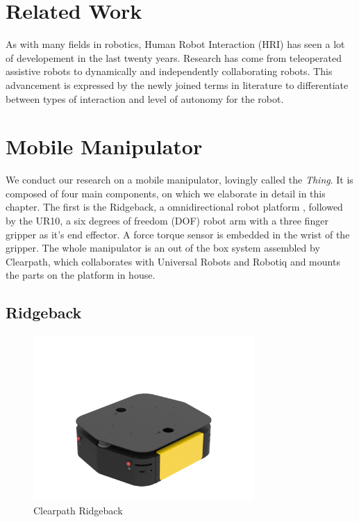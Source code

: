 \chapter{Related Work}
As with many fields in robotics, Human Robot Interaction (HRI) has seen a lot of developement in the last twenty years. Research has come from teleoperated assistive robots to dynamically and independently collaborating robots. This advancement is expressed by the newly joined terms in literature to differentiate between types of interaction and level of autonomy for the robot.

\chapter{Mobile Manipulator}
We conduct our research on a mobile manipulator, lovingly called the \emph{Thing}. It is composed of four main components, on which we elaborate in detail in this chapter. The first is the Ridgeback, a omnidirectional robot platform , followed by the UR10, a six degrees of freedom (DOF) robot arm with a three finger gripper as it's end effector. A force torque sensor is embedded in the wrist of the gripper. The whole manipulator is an out of the box system assembled by Clearpath, which collaborates with Universal Robots and Robotiq and mounts the parts on the platform in house.

\section{Ridgeback}

\begin{figure}
   \centering
   \includegraphics[width=0.75\textwidth]{images/ridgeback.png}
   \caption{Clearpath Ridgeback}
   \label{pics:ridgeback}
\end{figure}

